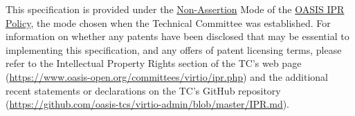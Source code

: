 This specification is provided under the
\href{https://www.oasis-open.org/policies-guidelines/ipr/#Non-Assertion-Mode}{Non-Assertion} Mode of the
\href{https://www.oasis-open.org/policies-guidelines/ipr/}{OASIS IPR Policy}, the
mode chosen when the Technical Committee was established. For information on
whether any patents have been disclosed that may be essential to implementing
this specification, and any offers of patent licensing terms, please refer to
the Intellectual Property Rights section of the TC's web page
(\url{https://www.oasis-open.org/committees/virtio/ipr.php})
and the additional recent statements or declarations on the TC's GitHub repository
(\url{https://github.com/oasis-tcs/virtio-admin/blob/master/IPR.md}).

